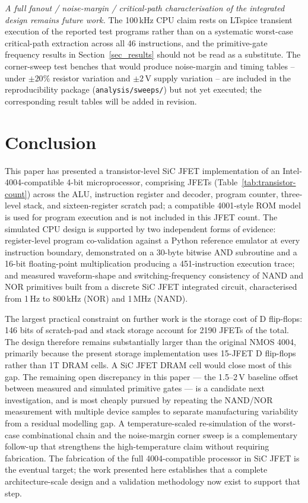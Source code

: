 \textit{A full fanout / noise-margin / critical-path characterisation of the integrated design remains future work.} The 100\,kHz CPU claim rests on LTspice transient execution of the reported test programs rather than on a systematic worst-case critical-path extraction across all 46 instructions, and the primitive-gate frequency results in Section~\ref{sec_results} should not be read as a substitute. The corner-sweep test benches that would produce noise-margin and timing tables -- under $\pm 20\%$ resistor variation and $\pm 2$\,V supply variation -- are included in the reproducibility package (\texttt{analysis/sweeps/}) but not yet executed; the corresponding result tables will be added in revision.

\section{Conclusion}\label{conclusion}

This paper has presented a transistor-level SiC JFET implementation of an Intel-4004-compatible 4-bit microprocessor, comprising \TotalJFETCount{} JFETs (Table~\ref{tab:transistor-count}) across the ALU, instruction register and decoder, program counter, three-level stack, and sixteen-register scratch pad; a compatible 4001-style ROM model is used for program execution and is not included in this JFET count. The simulated CPU design is supported by two independent forms of evidence: register-level program co-validation against a Python reference emulator at every instruction boundary, demonstrated on a 30-byte bitwise AND subroutine and a 16-bit floating-point multiplication producing a 451-instruction execution trace; and measured waveform-shape and switching-frequency consistency of NAND and NOR primitives built from a discrete SiC JFET integrated circuit, characterised from 1\,Hz to 800\,kHz (NOR) and 1\,MHz (NAND).

The largest practical constraint on further work is the storage cost of D flip-flops: 146 bits of scratch-pad and stack storage account for 2190 JFETs of the \TotalJFETCount{} total. The design therefore remains substantially larger than the original NMOS 4004, primarily because the present storage implementation uses 15-JFET D flip-flops rather than 1T DRAM cells. A SiC JFET DRAM cell would close most of this gap. The remaining open discrepancy in this paper --- the 1.5--2\,V baseline offset between measured and simulated primitive gates --- is a candidate next investigation, and is most cheaply pursued by repeating the NAND/NOR measurement with multiple device samples to separate manufacturing variability from a residual modelling gap. A temperature-scaled re-simulation of the worst-case combinational chain and the noise-margin corner sweep is a complementary follow-up that strengthens the high-temperature claim without requiring fabrication. The fabrication of the full 4004-compatible processor in SiC JFET is the eventual target; the work presented here establishes that a complete architecture-scale design and a validation methodology now exist to support that step.
